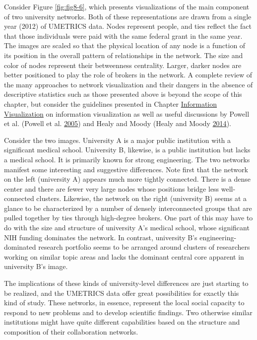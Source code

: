 \documentclass[]{krantz}
\begin{document}
Consider Figure \ref{fig:fig8-6}, which presents visualizations of the
main component of two university networks. Both of these representations
are drawn from a single year (2012) of UMETRICS data. Nodes represent
people, and ties reflect the fact that those individuals were paid with
the same federal grant in the same year. The images are scaled so that
the physical location of any node is a function of its position in the
overall pattern of relationships in the network. The size and color of
nodes represent their betweenness centrality. Larger, darker nodes are
better positioned to play the role of brokers in the network. A complete
review of the many approaches to network visualization and their dangers
in the absence of descriptive statistics such as those presented above
is beyond the scope of this chapter, but consider the guidelines
presented in Chapter \protect\hyperlink{chap:viz}{Information
Visualization} on information visualization as well as useful
discussions by Powell et al. (Powell et al.
\protect\hyperlink{ref-powell2005network}{2005}) and Healy and Moody
(Healy and Moody \protect\hyperlink{ref-healy2014data}{2014}).

Consider the two images. University A is a major public institution with
a significant medical school. University B, likewise, is a public
institution but lacks a medical school. It is primarily known for strong
engineering. The two networks manifest some interesting and suggestive
differences. Note first that the network on the left (university A)
appears much more tightly connected. There is a dense center and there
are fewer very large nodes whose positions bridge less well-connected
clusters. Likewise, the network on the right (university B) seems at a
glance to be characterized by a number of densely interconnected groups
that are pulled together by ties through high-degree brokers. One part
of this may have to do with the size and structure of university A's
medical school, whose significant NIH funding dominates the network. In
contrast, university B's engineering-dominated research portfolio seems
to be arranged around clusters of researchers working on similar topic
areas and lacks the dominant central core apparent in university B's
image.

The implications of these kinds of university-level differences are just
starting to be realized, and the UMETRICS data offer great possibilities
for exactly this kind of study. These networks, in essence, represent
the local social capacity to respond to new problems and to develop
scientific findings. Two otherwise similar institutions might have quite
different capabilities based on the structure and composition of their
collaboration networks.
\end{document}
